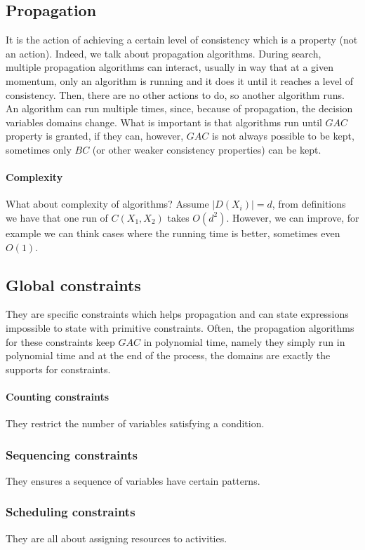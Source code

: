 \documentclass[10pt,a4paper]{article}
\begin{document}
\subsection{Propagation}
It is the action of achieving a certain level of consistency which is a property
(not an action). Indeed, we talk about propagation algorithms. During search,
multiple propagation algorithms can interact, usually in way that at a given
momentum, only an algorithm is running and it does it until it reaches a level
of consistency. Then, there are no other actions to do, so another algorithm
runs. An algorithm can run multiple times, since, because of propagation, the
decision variables domains change. What is important is that algorithms run
until $GAC$ property is granted, if they can, however, $GAC$ is not always
possible to be kept, sometimes only $BC$ (or other weaker consistency
properties) can be kept.

\paragraph{Complexity}
What about complexity of algorithms? Assume $ | D(X_i) | = d $, from definitions
we have that one run of $C(X_1, X_2)$ takes $ O(d^2) $. However, we can improve,
for example we can think cases where the running time is better, sometimes even
$O(1)$.

\subsection{Global constraints}
They are specific constraints which helps propagation and can state expressions
impossible to state with primitive constraints. Often, the propagation
algorithms for these constraints keep $GAC$ in polynomial time, namely they
simply run in polynomial time and at the end of the process, the domains are
exactly the supports for constraints.

\paragraph{Counting constraints}
They restrict the number of variables satisfying a condition.

\subsubsection{Sequencing constraints}
They ensures a sequence of variables have certain patterns.

\subsubsection{Scheduling constraints}
They are all about assigning resources to activities.
\end{document}
